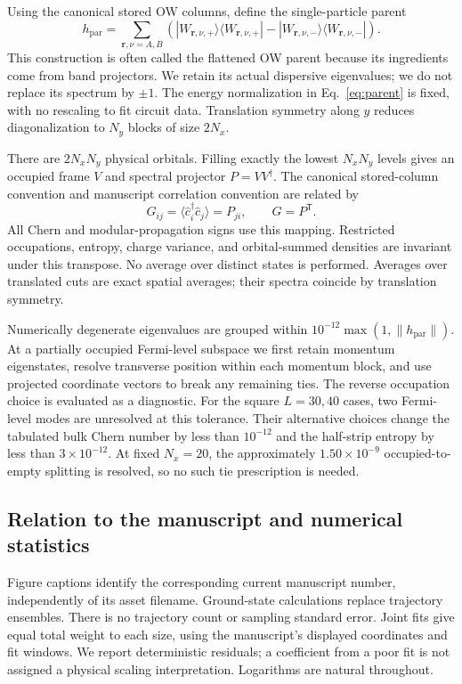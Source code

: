 \documentclass[aps,prb,onecolumn,nofootinbib,superscriptaddress]{revtex4-2}
\begin{document}
Using the canonical stored OW columns, define the single-particle parent
\begin{equation}
 h_{\mathrm{par}}=\sum_{\boldsymbol r,\nu=A,B}
 \left(|W_{\boldsymbol r,\nu,+}\rangle\langle W_{\boldsymbol r,\nu,+}|
       -|W_{\boldsymbol r,\nu,-}\rangle\langle W_{\boldsymbol r,\nu,-}|\right).
 \label{eq:parent}
\end{equation}
This construction is often called the flattened OW parent because its ingredients
come from band projectors. We retain its actual dispersive eigenvalues; we do not
replace its spectrum by $\pm1$. The energy normalization in Eq.~\eqref{eq:parent}
is fixed, with no rescaling to fit circuit data. Translation symmetry along $y$
reduces diagonalization to $N_y$ blocks of size $2N_x$.

There are $2N_xN_y$ physical orbitals. Filling exactly the lowest $N_xN_y$ levels
gives an occupied frame $V$ and spectral projector $P=VV^\dagger$. The canonical
stored-column convention and manuscript correlation convention are related by
\begin{equation}
 G_{ij}=\langle\hat c_i^\dagger\hat c_j\rangle=P_{ji},\qquad G=P^{\mathsf T}.
 \label{eq:convention}
\end{equation}
All Chern and modular-propagation signs use this mapping. Restricted occupations,
entropy, charge variance, and orbital-summed densities are invariant under this
transpose. No average over distinct states is performed. Averages over translated
cuts are exact spatial averages; their spectra coincide by translation symmetry.

Numerically degenerate eigenvalues are grouped within
$10^{-12}\max(1,\|h_{\mathrm{par}}\|)$. At a partially occupied Fermi-level
subspace we first retain momentum eigenstates, resolve transverse position within
each momentum block, and use projected coordinate vectors to break any remaining
ties. The reverse occupation choice is evaluated as a diagnostic. For the square
$L=30,40$ cases, two Fermi-level modes are unresolved at this tolerance. Their
alternative choices change the tabulated bulk Chern number by less than
$10^{-12}$ and the half-strip entropy by less than $3\times10^{-12}$.
At fixed $N_x=20$, the approximately $1.50\times10^{-9}$ occupied-to-empty
splitting is resolved, so no such tie prescription is needed.

\subsection{Relation to the manuscript and numerical statistics}
Figure captions identify the corresponding current manuscript number, independently
of its asset filename. Ground-state calculations replace trajectory ensembles.
There is no trajectory count or sampling standard error. Joint fits give equal
total weight to each size, using the manuscript's displayed coordinates and fit
windows. We report deterministic residuals; a coefficient from a poor fit is not
assigned a physical scaling interpretation. Logarithms are natural throughout.
\end{document}
